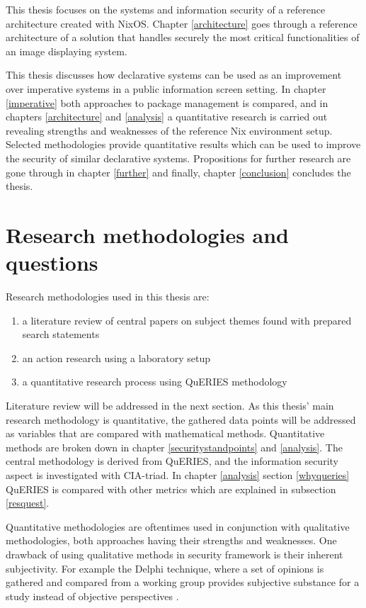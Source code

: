 This thesis focuses on the systems and information security of a
reference architecture created with NixOS. Chapter \ref{architecture}
goes through a reference architecture of a solution that handles
securely the most critical functionalities of an image displaying system.

This thesis discusses how declarative systems can be used as an
improvement over imperative systems in a public information screen
setting. In chapter \ref{imperative} both approaches to package
management is compared, and in chapters \ref{architecture} and
\ref{analysis} a quantitative research is carried out revealing
strengths and weaknesses of the reference Nix environment
setup. Selected methodologies provide quantitative results which can
be used to improve the security of similar declarative
systems. Propositions for further research are gone through in chapter
\ref{further} and finally, chapter \ref{conclusion} concludes the
thesis.

\section{Research methodologies and questions}

Research methodologies used in this thesis are:
\begin{enumerate}
\item a literature review of central papers on subject themes found
  with prepared search statements
\item an action research using a laboratory setup
\item a quantitative research process using QuERIES methodology
\end{enumerate}

Literature review will be addressed in the next section. As this
thesis' main research methodology is quantitative, the gathered data
points will be addressed as variables that are compared with
mathematical methods. Quantitative methods are broken down in chapter
\ref{securitystandpoints} and \ref{analysis}. The central methodology
is derived from QuERIES, and the information security aspect is
investigated with CIA-triad. In chapter \ref{analysis} section
\ref{whyqueries} QuERIES is compared with other metrics which are
explained in subsection \ref{resquest}.

Quantitative methodologies are oftentimes used in conjunction with
qualitative methodologies, both approaches having their strengths and
weaknesses. One drawback of using qualitative methods in security
framework is their inherent subjectivity. For example the Delphi
technique, where a set of opinions is gathered and compared from a
working group provides subjective substance for a study instead of
objective perspectives \cite{wang2005information}.

